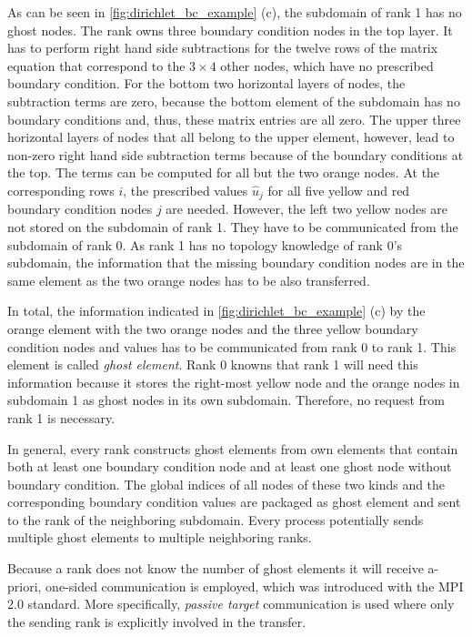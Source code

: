 As can be seen in \cref{fig:dirichlet_bc_example} (c), the subdomain of rank 1 has no ghost nodes. The rank owns three boundary condition nodes in the top layer. It has to perform right hand side subtractions for the twelve rows of the matrix equation that correspond to the $3\times 4$ other nodes, which have no prescribed boundary condition. For the bottom two horizontal layers of nodes, the subtraction terms are zero, because the bottom element of the subdomain has no boundary conditions and, thus, these matrix entries are all zero.
The upper three horizontal layers of nodes that all belong to the upper element, however, lead to non-zero right hand side subtraction terms because of the boundary conditions at the top. The terms can be computed for all but the two orange nodes. 
At the corresponding rows $i$, the prescribed values $\hat{u}_j$ for all five yellow and red boundary condition nodes $j$ are needed. However, the left two yellow nodes are not stored on the subdomain of rank 1. They have to be communicated from the subdomain of rank 0. As rank 1 has no topology knowledge of rank 0's subdomain, the information that the missing boundary condition nodes are in the same element as the two orange nodes has to be also transferred. 

In total, the information indicated in \cref{fig:dirichlet_bc_example} (c) by the orange element with the two orange nodes and the three yellow boundary condition nodes and values has to be communicated from rank 0 to rank 1. This element is called \emph{ghost element}.
Rank 0 knowns that rank 1 will need this information because it stores the right-most yellow node and the orange nodes in subdomain 1 as ghost nodes in its own subdomain. Therefore, no request from rank 1 is necessary.

In general, every rank constructs ghost elements from own elements that contain both at least one boundary condition node and at least one ghost node without boundary condition. The global indices of all nodes of these two kinds and the corresponding boundary condition values are packaged as ghost element and sent to the rank of the neighboring subdomain. Every process potentially sends multiple ghost elements to multiple neighboring ranks. 

Because a rank does not know the number of ghost elements it will receive a-priori, one-sided communication is employed, which was introduced with the MPI 2.0 standard. More specifically, \emph{passive target} communication is used where only the sending rank is explicitly involved in the transfer.

